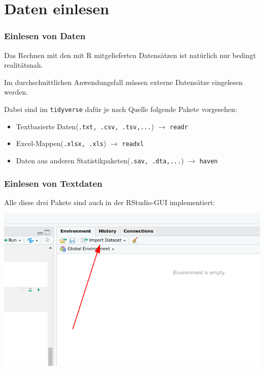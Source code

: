 \documentclass[
]{book}
\begin{document}
\hypertarget{daten-einlesen}{%
\chapter{Daten einlesen}\label{daten-einlesen}}

\hypertarget{einlesen-von-daten}{%
\subsection{Einlesen von Daten}\label{einlesen-von-daten}}

Das Rechnen mit den mit R mitgelieferten Datensätzen ist natürlich nur bedingt realitätsnah.

Im durchschnittlichen Anwendungsfall müssen externe Datensätze eingelesen werden.

Dabei sind im \texttt{tidyverse} dafür je nach Quelle folgende Pakete vorgesehen:

\begin{itemize}
\item
  Textbasierte Daten(\texttt{.txt,\ .csv,\ .tsv,...}) \(\rightarrow\) \texttt{readr}
\item
  Excel-Mappen(\texttt{.xlsx,\ .xls}) \(\rightarrow\) \texttt{readxl}
\item
  Daten aus anderen Statistikpaketen(\texttt{.sav,\ .dta,...}) \(\rightarrow\) \texttt{haven}
\end{itemize}

\hypertarget{einlesen-von-textdaten}{%
\subsection{Einlesen von Textdaten}\label{einlesen-von-textdaten}}

Alle diese drei Pakete sind auch in der RStudio-GUI implementiert:

\begin{center}\includegraphics[width=0.8\linewidth]{imgs/menu} \end{center}
\end{document}
